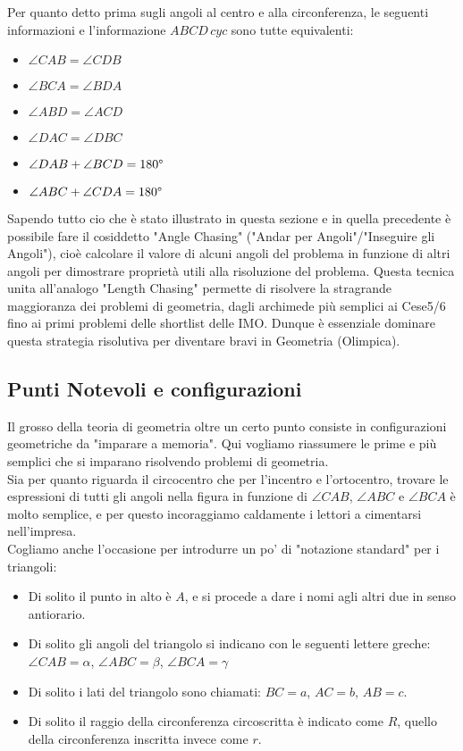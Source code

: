 \documentclass[11pt]{scrartcl}
\begin{document}
	\begin{remark}
		Per quanto detto prima sugli angoli al centro e alla circonferenza, le seguenti informazioni e l'informazione $ABCD\,cyc$ sono tutte equivalenti:
		\begin{itemize}
			\item $\angle CAB = \angle CDB$ 
			\item $\angle BCA = \angle BDA$ 
			\item $\angle ABD = \angle ACD$ 
			\item $\angle DAC = \angle DBC$ 
			\item $\angle DAB + \angle BCD = 180 \degree$ 
			\item $\angle ABC + \angle CDA = 180 \degree$ 
		\end{itemize}
	\end{remark}
	
	Sapendo tutto cio che è stato illustrato in questa sezione e in quella precedente è possibile fare il cosiddetto "Angle Chasing" ("Andar per Angoli"/"Inseguire gli Angoli"), cioè calcolare il valore di alcuni angoli del problema in funzione di altri angoli per dimostrare proprietà utili alla risoluzione del problema. Questa tecnica unita all'analogo "Length Chasing" permette di risolvere la stragrande maggioranza dei problemi di geometria, dagli archimede più semplici ai Cese5/6 fino ai primi problemi delle shortlist delle IMO. Dunque è essenziale dominare questa strategia risolutiva per diventare bravi in Geometria (Olimpica).
	
	\subsection{Punti Notevoli e configurazioni}
	Il grosso della teoria di geometria oltre un certo punto consiste in configurazioni geometriche da "imparare a memoria". Qui vogliamo riassumere le prime e più semplici che si imparano risolvendo problemi di geometria.\\
	Sia per quanto riguarda il circocentro che per l'incentro e l'ortocentro, trovare le espressioni di tutti gli angoli nella figura in funzione di $\angle CAB$, $\angle ABC$ e $\angle BCA$ è molto semplice, e per questo incoraggiamo caldamente i lettori a cimentarsi nell'impresa. \\
	Cogliamo anche l'occasione per introdurre un po' di "notazione standard" per i triangoli:
	\begin{itemize}
		\item Di solito il punto in alto è $A$, e si procede a dare i nomi agli altri due in senso antiorario.
		\item Di solito gli angoli del triangolo si indicano con le seguenti lettere greche: \\
		$\angle CAB=\alpha$, $\angle ABC = \beta$, $\angle BCA = \gamma$
		\item Di solito i lati del triangolo sono chiamati: $BC=a$, $AC=b$, $AB=c$.
		\item Di solito il raggio della circonferenza circoscritta è indicato come $R$, quello della circonferenza inscritta invece come $r$.
	\end{itemize}
\end{document}

